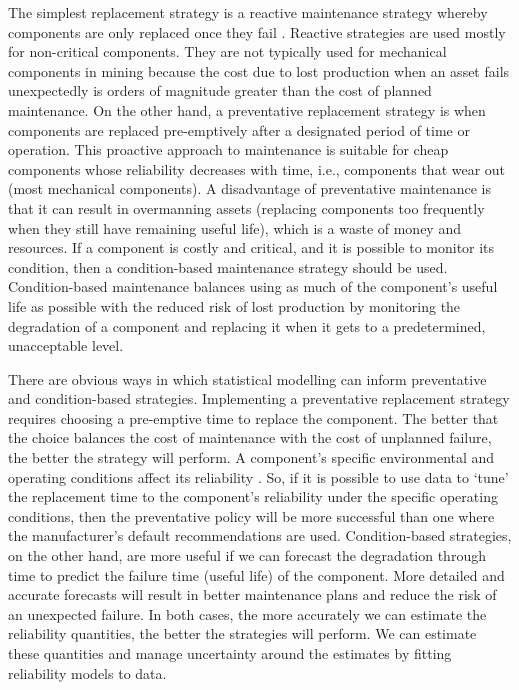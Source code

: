 The simplest replacement strategy is a reactive maintenance strategy whereby components are only replaced once they fail \citep{heng2009}. Reactive strategies are used mostly for non-critical components. They are not typically used for mechanical components in mining because the cost due to lost production when an asset fails unexpectedly is orders of magnitude greater than the cost of planned maintenance. On the other hand, a preventative replacement strategy is when components are replaced pre-emptively after a designated period of time or operation. This proactive approach to maintenance is suitable for cheap components whose reliability decreases with time, i.e., components that wear out (most mechanical components). A disadvantage of preventative maintenance is that it can result in overmanning assets (replacing components too frequently when they still have remaining useful life), which is a waste of money and resources. If a component is costly and critical, and it is possible to monitor its condition, then a condition-based maintenance strategy should be used. Condition-based maintenance balances using as much of the component's useful life as possible with the reduced risk of lost production by monitoring the degradation of a component and replacing it when it gets to a predetermined, unacceptable level.

There are obvious ways in which statistical modelling can inform preventative and condition-based strategies. Implementing a preventative replacement strategy requires choosing a pre-emptive time to replace the component. The better that the choice balances the cost of maintenance with the cost of unplanned failure, the better the strategy will perform. A component's specific environmental and operating conditions affect its reliability \citep{Meeker2022}. So, if it is possible to use data to `tune' the replacement time to the component's reliability under the specific operating conditions, then the preventative policy will be more successful than one where the manufacturer's default recommendations are used. Condition-based strategies, on the other hand, are more useful if we can forecast the degradation through time to predict the failure time (useful life) of the component. More detailed and accurate forecasts will result in better maintenance plans and reduce the risk of an unexpected failure. In both cases, the more accurately we can estimate the reliability quantities, the better the strategies will perform. We can estimate these quantities and manage uncertainty around the estimates by fitting reliability models to data.

